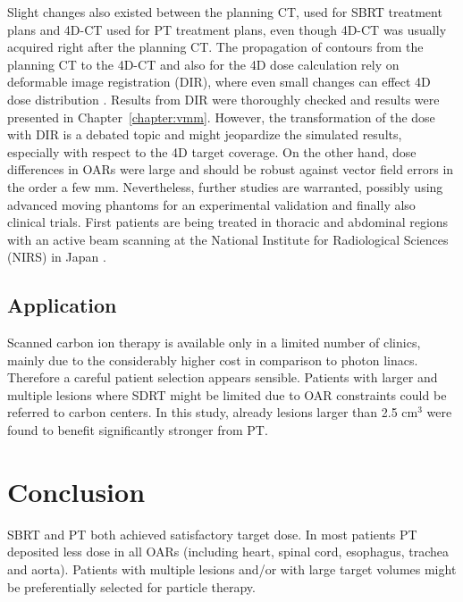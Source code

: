 Slight changes also existed between the planning CT, used for SBRT treatment plans and 4D-CT used for PT treatment plans, even though 4D-CT was usually acquired right after the planning CT. 
The propagation of contours from the planning CT to the 4D-CT and also for the 4D dose calculation rely on deformable image registration (DIR), where even small changes can effect 4D dose distribution \cite{Kashani2008}. 
Results from DIR were thoroughly checked and results were presented in Chapter~\ref{chapter:vmm}. However, the transformation of the dose with DIR is a debated topic and might jeopardize the simulated results, especially with respect to the 4D target coverage. On the other hand, dose differences 
in OARs were large and should be robust against vector field errors in the order a few mm. Nevertheless, further studies are warranted, possibly using advanced moving phantoms for an experimental 
validation \cite{Perrin2014} and finally also clinical trials. First patients are being treated in thoracic and abdominal regions with an active beam scanning at the National Institute for Radiological Sciences (NIRS) in Japan \cite{Mori2016}.



\subsection{Application}

Scanned carbon ion therapy is available only in a limited number of clinics, mainly due to the considerably higher cost in comparison to photon linacs.
Therefore a careful patient selection appears sensible. Patients with larger and multiple lesions where SDRT might be limited due to OAR constraints 
could be referred to carbon centers. In this study, already lesions larger than 2.5 cm$^3$ were found to benefit significantly stronger from PT.

\section{Conclusion}
SBRT and PT both achieved satisfactory target dose. In most patients PT deposited less dose in all OARs (including heart, spinal cord, esophagus, trachea and aorta). Patients with multiple lesions and/or with large target volumes might be preferentially selected for particle therapy.

